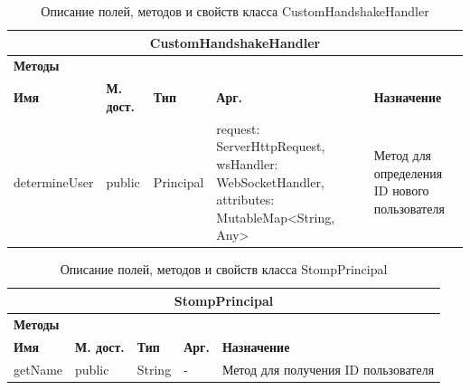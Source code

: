 \documentclass{../includes/TechDoc}
\begin{document}
    \begin{table}[h]
        \caption{\label{tab:class-CustomHandshakeHandler-table}Описание полей, методов и свойств класса CustomHandshakeHandler}
        \begin{tabularx}{\textwidth}{|l|l|l|p{4cm}|X|}
            \hline
            \multicolumn{5}{|c|}{CustomHandshakeHandler} \\ \hline
            \multicolumn{5}{|l|}{\textbf{Методы}} \\ \hline
            \textbf{Имя}  & \textbf{М. дост.} & \textbf{Тип} & \textbf{Арг.}                                                                                & \textbf{Назначение}                          \\ \hline
            determineUser & public            & Principal    & request: ServerHttpRequest, wsHandler: WebSocketHandler, attributes: MutableMap<String, Any>
            & Метод для определения ID нового пользователя
            \\ \hline
        \end{tabularx}
    \end{table}

    \begin{table}[h]
        \caption{\label{tab:class-StompPrincipal-table}Описание полей, методов и свойств класса StompPrincipal}
        \begin{tabularx}{\textwidth}{|l|l|l|l|X|}
            \hline
            \multicolumn{5}{|c|}{StompPrincipal} \\ \hline
            \multicolumn{5}{|l|}{\textbf{Методы}} \\ \hline
            \textbf{Имя} & \textbf{М. дост.} & \textbf{Тип} & \textbf{Арг.} & \textbf{Назначение}                 \\ \hline
            getName      & public            & String       & -             & Метод для получения ID пользователя \\ \hline
        \end{tabularx}
    \end{table}
\end{document}
